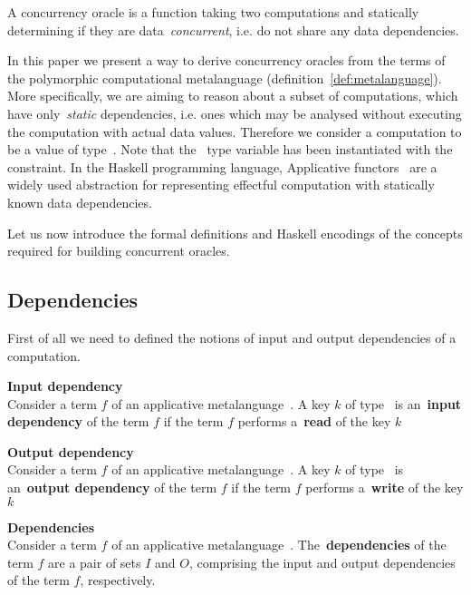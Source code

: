 A concurrency oracle is a function taking two computations and statically
determining if they are data~\emph{concurrent}, i.e. do not share any
data dependencies.

In this paper we present a way to derive concurrency oracles from the terms of
the polymorphic computational metalanguage (definition~\ref{def:metalanguage}).
More specifically, we are aiming to reason about a subset of computations,
which have only~\emph{static} dependencies, i.e. ones which may be analysed without
executing the computation with actual data values.
Therefore we consider a computation to be a value of type~.
Note that the~ type variable has been instantiated with the~
constraint. In the Haskell programming language, Applicative functors~\cite{Mcbride:2008:APE:1348940.1348941}
are a widely used abstraction for representing effectful computation with statically
known data dependencies.

Let us now introduce the formal definitions and Haskell encodings of the concepts
required for building concurrent oracles.

\subsection{Dependencies}

First of all we need to defined the notions of input and output dependencies of
a computation.

\label{def:dependencies}
\begin{definition}
\textbf{Input dependency}\\
Consider a term $f$ of an applicative metalanguage~. A key $k$ of
type~ is an~\textbf{input dependency} of the term $f$ if the term $f$
performs a~\textbf{read} of the key $k$
\end{definition}
\begin{definition}
\textbf{Output dependency}\\
Consider a term $f$ of an applicative metalanguage~. A key $k$ of
type~ is an~\textbf{output dependency} of the term $f$ if the term $f$
performs a~\textbf{write} of the key $k$
\end{definition}
\begin{definition}
\textbf{Dependencies}\\
Consider a term $f$ of an applicative metalanguage~.
The~\textbf{dependencies} of the term $f$ are a pair of sets $I$ and $O$,
comprising the input and output dependencies of the term $f$, respectively.
\end{definition}

